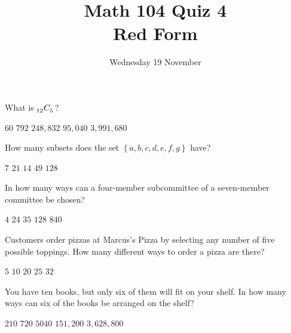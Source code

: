 \documentclass[answers,12pt]{exam}
\title{Math 104 Quiz 4\\Red Form}
\date{Wednesday 19 November}
\newcommand\ncr[2]{\tensor[_{#1}]C{_{#2}}}
\begin{document}
\maketitle
\begin{center}
\end{center}

\begin{questions}

\question What is $\ncr{12}{5}$?\\
\begin{oneparchoices}
\choice $60$ %
\correctchoice $792$
\choice $248,832$ %
\choice $95,040$ %
\choice $3,991,680$ %
\end{oneparchoices}

\question How many subsets does the set
$\left\{a,b,c,d,e,f,g\right\}$ have?\\
\begin{oneparchoices}
\choice $7$ %
\choice $21$ %
\choice $14$ %
\choice $49$ %
\correctchoice $128$
\end{oneparchoices}

\question In how many ways can a four-member subcommittee
of a seven-member committee be chosen?\\
\begin{oneparchoices}
\choice $4$ %
\choice $24$ %
\correctchoice $35$
\choice $128$ %
\choice $840$ %
\end{oneparchoices}

\question Customers order pizzas at Marcus's Pizza
by selecting any number of five possible toppings.
How many different ways to order a pizza are there?\\
\begin{oneparchoices}
\choice $5$ %
\choice $10$ %
\choice $20$ %
\choice $25$ %
\correctchoice $32$
\end{oneparchoices}

\question You have ten books, but only six
of them will fit on your shelf. In how many 
ways can six of the books be arranged on the shelf?\\
\begin{oneparchoices}
\choice $210$ %
\choice $720$ %
\choice $5040$ %
\correctchoice $151,200$
\choice $3,628,800$ %
\end{oneparchoices}


\end{questions}
\end{document}
